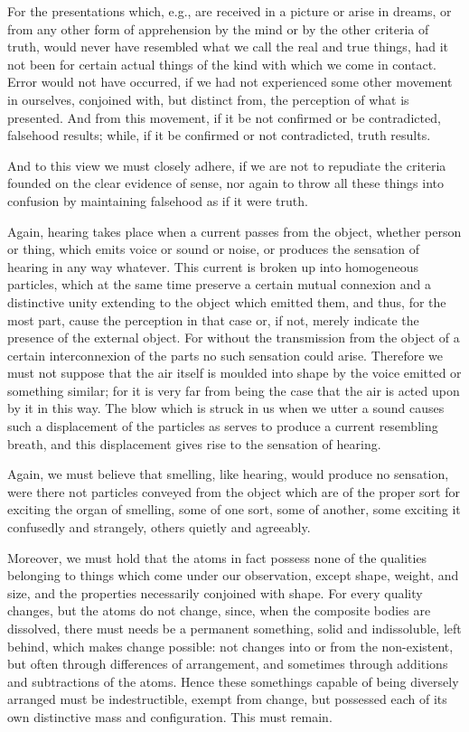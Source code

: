 \documentclass{stex}
\begin{document}
For the presentations which, e.g., are received in a picture or arise in dreams, or from any other form of apprehension by the mind or by the other criteria of truth, would never have resembled what we call the real and true things, had it not been for certain actual things of the kind with which we come in contact.
Error would not have occurred, if we had not experienced some other movement in ourselves, conjoined with, but distinct from, the perception of what is presented.
And from this movement, if it be not confirmed or be contradicted, falsehood results; while, if it be confirmed or not contradicted, truth results.

And to this view we must closely adhere, if we are not to repudiate the criteria founded on the clear evidence of sense, nor again to throw all these things into confusion by maintaining falsehood as if it were truth.

Again, hearing takes place when a current passes from the object, whether person or thing, which emits voice or sound or noise, or produces the sensation of hearing in any way whatever.
This current is broken up into homogeneous particles, which at the same time preserve a certain mutual connexion and a distinctive unity extending to the object which emitted them, and thus, for the most part, cause the perception in that case or, if not, merely indicate the presence of the external object.
For without the transmission from the object of a certain interconnexion of the parts no such sensation could arise.
Therefore we must not suppose that the air itself is moulded into shape by the voice emitted or something similar; for it is very far from being the case that the air is acted upon by it in this way.
The blow which is struck in us when we utter a sound causes such a displacement of the particles as serves to produce a current resembling breath, and this displacement gives rise to the sensation of hearing.

Again, we must believe that smelling, like hearing, would produce no sensation, were there not particles conveyed from the object which are of the proper sort for exciting the organ of smelling, some of one sort, some of another, some exciting it confusedly and strangely, others quietly and agreeably.

Moreover, we must hold that the atoms in fact possess none of the qualities belonging to things which come under our observation, except shape, weight, and size, and the properties necessarily conjoined with shape.
For every quality changes, but the atoms do not change, since, when the composite bodies are dissolved, there must needs be a permanent something, solid and indissoluble, left behind, which makes change possible: not changes into or from the non-existent, but often through differences of arrangement, and sometimes through additions and subtractions of the atoms.
Hence these somethings capable of being diversely arranged must be indestructible, exempt from change, but possessed each of its own distinctive mass and configuration.
This must remain.
\end{document}
